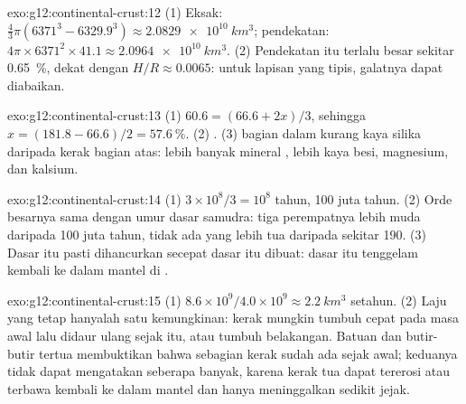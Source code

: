 \begin{solution}{exo:g12:continental-crust:12}
(1) Eksak: $\tfrac{4}{3}\pi(6371^3 - 6329.9^3) \approx
\qty{2.0829e10}{km^3}$; pendekatan: $4\pi \times 6371^2 \times 41.1
\approx \qty{2.0964e10}{km^3}$. (2) Pendekatan itu terlalu besar sekitar
\qty{0.65}{\percent}, dekat dengan $H/R \approx 0.0065$: untuk lapisan yang
tipis, galatnya dapat diabaikan.
\end{solution}

\begin{solution}{exo:g12:continental-crust:13}
(1) $60.6 = (66.6 + 2x)/3$, sehingga $x = (181.8 - 66.6)/2 = \qty{57.6}{\percent}$.
(2) . (3)  bagian dalam kurang kaya silika daripada kerak
bagian atas: lebih banyak mineral , lebih kaya besi, magnesium, dan
kalsium.
\end{solution}

\begin{solution}{exo:g12:continental-crust:14}
(1) $3 \times 10^8/3 = 10^8$ tahun, 100 juta tahun. (2) Orde besarnya sama
dengan umur dasar samudra: tiga perempatnya lebih muda daripada 100 juta tahun,
tidak ada yang lebih tua daripada sekitar 190. (3) Dasar itu pasti dihancurkan
secepat dasar itu dibuat: dasar itu tenggelam kembali ke dalam mantel di .
\end{solution}

\begin{solution}{exo:g12:continental-crust:15}
(1) $8.6 \times 10^9 / 4.0 \times 10^9 \approx \qty{2.2}{km^3}$ setahun.
(2) Laju yang tetap hanyalah satu kemungkinan: kerak mungkin tumbuh cepat pada
masa awal lalu didaur ulang sejak itu, atau tumbuh belakangan. Batuan dan
butir-butir tertua membuktikan bahwa sebagian kerak sudah ada sejak awal;
keduanya tidak dapat mengatakan seberapa banyak, karena kerak tua dapat
tererosi atau terbawa kembali ke dalam mantel dan hanya meninggalkan sedikit
jejak.
\end{solution}

